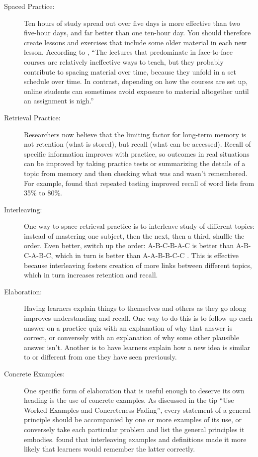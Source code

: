 \documentclass[10pt,letterpaper]{article}
\begin{document}
\begin{description}

\item[Spaced Practice:] Ten hours of study spread out over five days is more
  effective than two five-hour days, and far better than one ten-hour day. You
  should therefore create lessons and exercises that include some older material
  in each new lesson.  According to \cite{Mill2016}, ``The lectures that
  predominate in face-to-face courses are relatively ineffective ways to teach,
  but they probably contribute to spacing material over time, because they
  unfold in a set schedule over time.  In contrast, depending on how the courses
  are set up, online students can sometimes avoid exposure to material
  altogether until an assignment is nigh.''

\item[Retrieval Practice:] Researchers now believe that the limiting factor for
  long-term memory is not retention (what is stored), but recall (what can be
  accessed).  Recall of specific information improves with practice, so outcomes
  in real situations can be improved by taking practice tests or summarizing the
  details of a topic from memory and then checking what was and wasn't
  remembered. For example, \cite{Karp2008} found that repeated testing improved
  recall of word lists from 35\% to 80\%.

\item[Interleaving:] One way to space retrieval practice is to interleave study
  of different topics: instead of mastering one subject, then the next, then a
  third, shuffle the order. Even better, switch up the order: A-B-C-B-A-C is
  better than A-B-C-A-B-C, which in turn is better than A-A-B-B-C-C
  \cite{Rohr2015}. This is effective because interleaving fosters creation of
  more links between different topics, which in turn increases retention and
  recall.

\item[Elaboration:] Having learners explain things to themselves and others as
  they go along improves understanding and recall. One way to do this is to
  follow up each answer on a practice quiz with an explanation of why that
  answer is correct, or conversely with an explanation of why some other
  plausible answer isn't. Another is to have learners explain how a new idea is
  similar to or different from one they have seen previously.

\item[Concrete Examples:] One specific form of elaboration that is useful enough
  to deserve its own heading is the use of concrete examples.  As discussed in
  the tip ``Use Worked Examples and Concreteness Fading'', every statement of a
  general principle should be accompanied by one or more examples of its use, or
  conversely take each particular problem and list the general principles it
  embodies. \cite{Raws2014} found that interleaving examples and definitions
  made it more likely that learners would remember the latter correctly.


\end{description}
\end{document}
